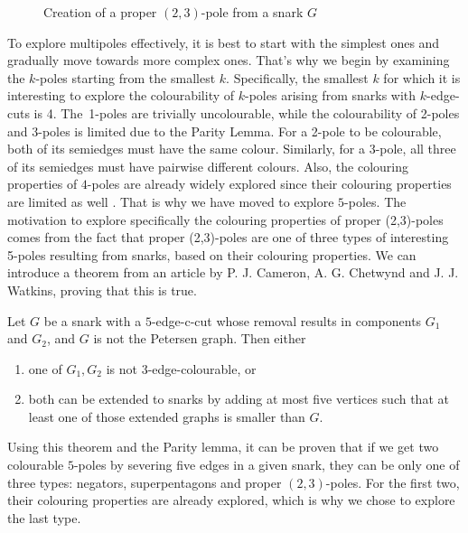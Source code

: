 \begin{figure*}
	\centering
	
	\caption{Creation of a proper $(2,3)$-pole from a snark $G$}
	\label{fig:23-pole-example}
\end{figure*}

To explore multipoles effectively, it is best to start with the simplest ones and gradually move towards more complex ones. That's why we begin by examining the $k$-poles starting from the smallest $k$. Specifically, the smallest $k$ for which it is interesting to explore the colourability of $k$-poles arising from snarks with $k$-edge-cuts is 4. The~1-poles are trivially uncolourable, while the colourability of 2-poles and 3-poles is limited due to the Parity Lemma. For a 2-pole to be colourable, both of its semiedges must have the same colour. Similarly, for a 3-pole, all three of its semiedges must have pairwise different colours. Also, the colouring properties of $4$-poles are already widely explored since their colouring properties are limited as well \cite{ChladnyFactorisation}. That is why we have moved to explore $5$-poles. The motivation to explore specifically the colouring properties of proper (2,3)-poles comes from the fact that proper (2,3)-poles are one of three types of interesting 5-poles resulting from snarks, based on their colouring properties. We can introduce a theorem from an article by P. J. Cameron, A. G. Chetwynd and J. J. Watkins, proving that this is true.

\begin{theorem}
	Let $G$ be a snark with a $5$-edge-c-cut whose removal results in components $G_1$ and $G_2$, and $G$ is not the Petersen graph. Then either
	\begin{enumerate}[nolistsep]
		\item one of $G_1,G_2$ is not 3-edge-colourable, or
		\item both can be extended to snarks by adding at most five vertices such that at least one of those extended graphs is smaller than $G$.
	\end{enumerate}
\end{theorem}

Using this theorem and the Parity lemma, it can be proven that if we get two colourable $5$-poles by severing five edges in a given snark, they can be only one of three types: negators, superpentagons and proper $(2,3)$-poles. For the first two, their colouring properties are already explored, which is why we chose to explore the last type.


